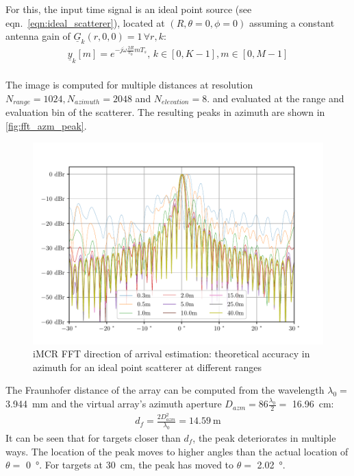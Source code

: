 For this, the input time signal is an ideal point source (see eqn.\ \ref{eqn:ideal_scatterer}),
located at $(R,\theta=0,\phi=0)$
assuming a constant antenna gain of $\underline G_k(r,0,0)=1 \,\forall r,k$:
\begin{align}
    \underline y_k[m] =  e^{-j\dot \omega \frac{2R}{c_0} m T_s}
    ,\,k\in[0,K-1],m\in[0,M-1]
\end{align}
\\
The image is computed for multiple distances at resolution
$N_{range} = 1024, N_{azimuth} = 2048$ and $N_{elevation} = 8$.
and evaluated at the range and evaluation bin of the scatterer.
The resulting peaks in azimuth are shown in \autoref{fig:fft_azm_peak}.
\begin{figure}[h]
    \centering
    \includegraphics[width=\textwidth]{../figures/fft_azm_peak.pdf}
    \caption{iMCR FFT direction of arrival estimation: theoretical accuracy in azimuth for an ideal point scatterer at different ranges}
    \label{fig:fft_azm_peak}
\end{figure}

The Fraunhofer distance of the array can be computed from the wavelength $\lambda_0=$ \SIlist{3.944}{\mm}
and the virtual array's azimuth aperture $D_{azm} = 86 \frac{\lambda_0}{2}=$ \SI{16.96}{\cm}:
\begin{align}
    d_f  = \frac{2D_{azm}^2}{\lambda_0}
    = \SI{14.59}{\m}
\end{align}
It can be seen that for targets closer than $d_f$, the peak deteriorates in multiple ways.
The location of the peak moves to higher angles than the actual location of $\theta =$ \SI{0}{\degree}.
For targets at \SI{30}{\cm}, the peak has moved to $\theta =$ \SI{2.02}{\degree}.

